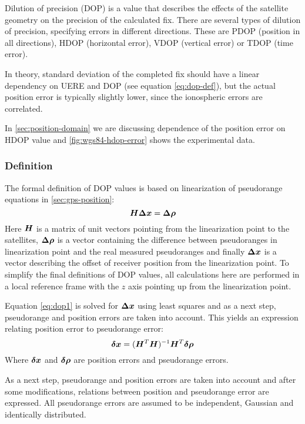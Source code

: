 Dilution of precision (DOP) is a value that describes the effects of the satellite geometry
on the precision of the calculated fix.
There are several types of dilution of precision, specifying errors in different directions.
These are PDOP (position in all directions), HDOP (horizontal error), VDOP (vertical error)
or TDOP (time error).

In theory, standard deviation of the completed fix should have a linear dependency on
UERE and DOP (see equation \eqref{eq:dop-def}), but the actual position error is typically slightly lower,
since the ionospheric errors are correlated.

In \cref{sec:position-domain} we are discussing dependence of the position error on HDOP value
and \cref{fig:wgs84-hdop-error} shows the experimental data.

\subsubsection{Definition}
The formal definition of DOP values is based on linearization of pseudorange equations
in \cref{sec:gps-position}:
\begin{equation}
	\label{eq:dop1}
	\bm{H}\bm{\Delta{}x} = \bm{\Delta{}\rho}
\end{equation}
Here \(\bm{H}\) is a matrix of unit vectors pointing from the linearization point
to the satellites, \(\bm{\Delta{}\rho}\) is a vector containing the difference between
pseudoranges in linearization point and the real measured pseudoranges and finally
\(\bm{\Delta{}x}\) is a vector describing the offset of receiver position from the
linearization point.
To simplify the final definitions of DOP values, all calculations here are performed
in a local reference frame with the \(z\) axis pointing up from the linearization point.

Equation \eqref{eq:dop1} is solved for \(\bm{\Delta{}x}\) using least squares and
as a next step, pseudorange and position errors are taken into account.
This yields an expression relating position error to pseudorange error:
\begin{equation}
	\bm{\delta{}x} = (\bm{H}^T \bm{H})^{-1} \bm{H}^T \bm{\delta{}\rho}
\end{equation}
Where \(\bm{\delta{}x}\) and \(\bm{\delta{}\rho}\) are position errors and pseudorange errors.

As a next step, pseudorange and position errors are taken into account and after
some modifications, relations between position and pseudorange error are expressed.
All pseudorange errors are assumed to be independent, Gaussian and identically distributed.

